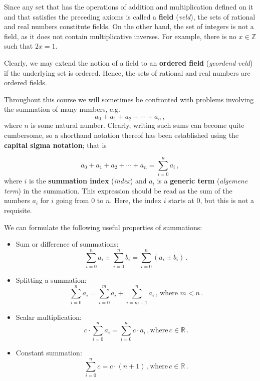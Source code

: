 	Since any set  that has the operations of addition and multiplication
	defined on it and that satisfies the preceding axioms is called a \textbf{field} (\textit{veld}), the sets of rational and real numbers constitute fields.  On the other hand, the set of integers is not a field, as it does not contain multiplicative inverses. For example, there is no $x\in\mathbb{Z}$ such that $2x=1$.
	
	Clearly, we may extend the notion of a field to an \textbf{ordered field} (\textit{geordend veld}) if the underlying set is ordered. Hence, the sets of rational and real numbers are ordered fields.

\fi

Throughout this course we will sometimes be confronted with problems involving the summation of many numbers, e.g.
$$
a_0+a_1+a_2+\cdots+a_n\,,
$$
where $n$ is some natural number. Clearly, writing such sums can become quite cumbersome, so a shorthand notation thereof has been established using the \textbf{capital sigma notation}; that is

$$
a_0+a_1+a_2+\cdots+a_n=\displaystyle\sum_{i=0}^na_i\,,
$$
where $i$ is the \textbf{summation index}  (\textit{index}) and $a_i$ is a \textbf{generic term}  (\textit{algemene term}) in the summation. This expression should be read as the sum of the numbers $a_i$ for $i$ going from 0 to $n$. Here, the index $i$ starts at 0, but this is not a requisite. 

We can formulate the following useful properties of summations:
\begin{itemize}
	\item Sum or difference of summations:
	$$
	\displaystyle\sum_{i=0}^n a_i\pm \displaystyle\sum_{i=0}^nb_i=\displaystyle\sum_{i=0}^n\left(a_i\pm b_i\right)\,.
	$$
	\item Splitting a summation:
	$$
	\displaystyle\sum_{i=0}^n a_i=\displaystyle\sum_{i=0}^m a_i+\displaystyle\sum_{i=m+1}^n a_i\,,\, \text{where } m<n\,.
	$$
	\item Scalar multiplication:
	$$
	c\cdot \displaystyle\sum_{i=0}^n a_i=\displaystyle\sum_{i=0}^n c\cdot a_i\,, \text{where}\, c\in\mathbb{R}\,.
	$$
	\item Constant summation:
	$$
	\displaystyle\sum_{i=0}^n c=c\cdot(n+1)\,, \text{where}\, c\in\mathbb{R}\,. 
	$$
	
\end{itemize}

